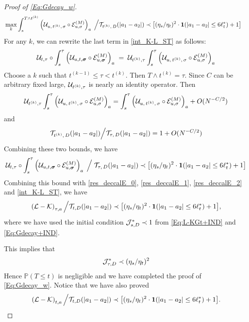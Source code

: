 \documentclass[10pt,reqno]{article}
\theoremstyle{plain} %
\theoremstyle{remark}
\numberwithin{equation}{section}
\begin{document}
\begin{proof}[Proof of \eqref{Eq:Gdecay_w}]
\begin{align}
  & \max_k\int_s^{T\wedge t^{(k)}} \left(\mathcal{U}_{u,\, t^{(k)},\, \sigma} \circ \mathcal{E}_{u, \sigma}^{(M)}\right)_{\textbf{a}}\;\Big/{\cal T}_{t^{(k)}, \,D}(|a_1-a_2|) \prec  \big [ (\eta_s/\eta_{t })^{2}  \cdot {\bf 1}(|a_1-a_2|\le 6\ell_{t }^*)+1 \big ]
 \end{align}
For any $k$, we can rewrite  the last term in   \eqref{int_K-L_ST} as follows: 
$$
 {\cal U}_{t,\tau}\circ \int_{s}^\tau \left(\mathcal{U}_{u, t, \boldsymbol{\sigma}} \circ \mathcal{E}^{(M)}_{u, \boldsymbol{\sigma}}\right)_{\textbf{a}}\;=\;{\cal U}_{t^{(k)},\tau }\int_s^{\tau } \left(\mathcal{U}_{u,\, t^{(k)},\, \sigma} \circ \mathcal{E}_{u, \sigma}^{(M)}\right)_{\textbf{a}} 
$$
Choose  a $k$ such that  $t^{(k-1)}\le \tau < t^{(k)}$. Then $T\wedge t^{(k)}= \tau$. 
Since $C$ can be arbitrary fixed large,  $ {\cal U}_{t^{(k)},\tau }$ is  nearly an identity operator. Then
$$
{\cal U}_{t^{(k)},\tau }\int_s^{\tau } \left(\mathcal{U}_{u,\, t^{(k)},\, \sigma} \circ \mathcal{E}_{u, \sigma}^{(M)}\right)_{\textbf{a}} =\int_s^{\tau } \left(\mathcal{U}_{u,\, t^{(k)},\, \sigma} \circ \mathcal{E}_{u, \sigma}^{(M)}\right)_{\textbf{a}} +O(N^{-C/2})
$$
and
$$
{\cal T}_{t^{(k)}, \,D}(|a_1-a_2|)\Big/{\cal T}_{\tau, \,D}(|a_1-a_2|)=1+O(N^{-C/2})
$$
Combining  these two bounds, we have 
$$
 {\cal U}_{t,\tau}\circ \int_{s}^\tau \left(\mathcal{U}_{u, t, \boldsymbol{\sigma}} \circ \mathcal{E}^{(M)}_{u, \boldsymbol{\sigma}}\right)_{\textbf{a}} \; \Big/\; {\cal T}_{\tau, \,D}(|a_1-a_2|) \prec  \big [ (\eta_s/\eta_{t })^{2}  \cdot {\bf 1}(|a_1-a_2|\le 6\ell_{t }^*)+1 \big ]
 $$
 Combining this  bound with  \eqref{res_deccalE_0}, \eqref{res_deccalE_1},   \eqref{res_deccalE_2}  and  \eqref{int_K-L_ST}, we have 
$$
\left({\cal L}-{\cal K}\right)_{\tau, \textbf{a}}\Big/{\cal T}_{t, D}(|a_1-a_2|) \prec   \big [ (\eta_s/\eta_t)^{2}  \cdot {\bf 1}(|a_1-a_2|\le 6\ell_t^*)+1 \big ], 
$$
where we have used the initial condition ${\cal J}^*_{s,D} \prec 1$ from \eqref{Eq:L-KGt+IND} and \eqref{Eq:Gdecay+IND}.  


 
This implies that 
\begin{align}\label{52}
 {\cal J}^*_{\tau,D}\prec     (\eta_s/\eta_t)^{2}  
\end{align}
Hence  ${\mathbb P} (T\le t ) $ is negligible and we have completed  the proof of \eqref{Eq:Gdecay_w}.
 Notice that we have also proved 
\begin{align}\label{53}
\left({\cal L}-{\cal K}\right)_{t, \textbf{a}}\Big/{\cal T}_{t, D}(|a_1-a_2|) \prec   \big [ (\eta_s/\eta_t)^{2}  \cdot {\bf 1}(|a_1-a_2|\le 6\ell_t^*)+1 \big ].
\end{align}

    
\end{proof}
 
\end{document}
